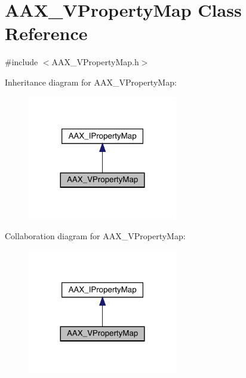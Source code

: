 \hypertarget{a01937}{}\section{A\+A\+X\+\_\+\+V\+Property\+Map Class Reference}
\label{a01937}


{\ttfamily \#include $<$A\+A\+X\+\_\+\+V\+Property\+Map.\+h$>$}



Inheritance diagram for A\+A\+X\+\_\+\+V\+Property\+Map\+:
\nopagebreak
\begin{figure}[H]
\begin{center}
\leavevmode
\includegraphics[width=185pt]{a01936}
\end{center}
\end{figure}


Collaboration diagram for A\+A\+X\+\_\+\+V\+Property\+Map\+:
\nopagebreak
\begin{figure}[H]
\begin{center}
\leavevmode
\includegraphics[width=185pt]{a01935}
\end{center}
\end{figure}


